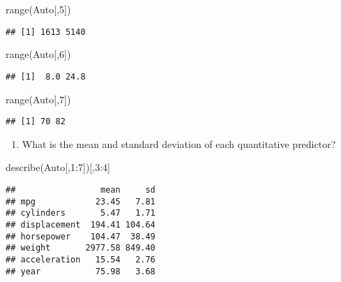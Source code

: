 \documentclass[
]{article}
\newenvironment{Shaded}{\begin{snugshade}}{\end{snugshade}}
\newcommand{\DecValTok}[1]{\textcolor[rgb]{0.00,0.00,0.81}{#1}}
\newcommand{\FunctionTok}[1]{\textcolor[rgb]{0.00,0.00,0.00}{#1}}
\newcommand{\NormalTok}[1]{#1}
\newcommand{\SpecialCharTok}[1]{\textcolor[rgb]{0.00,0.00,0.00}{#1}}
\providecommand{\tightlist}{%
  \setlength{\itemsep}{0pt}\setlength{\parskip}{0pt}}
\begin{document}
\begin{Shaded}
\begin{Highlighting}[]
\FunctionTok{range}\NormalTok{(Auto[,}\DecValTok{5}\NormalTok{])}
\end{Highlighting}
\end{Shaded}

\begin{verbatim}
## [1] 1613 5140
\end{verbatim}

\begin{Shaded}
\begin{Highlighting}[]
\FunctionTok{range}\NormalTok{(Auto[,}\DecValTok{6}\NormalTok{])}
\end{Highlighting}
\end{Shaded}

\begin{verbatim}
## [1]  8.0 24.8
\end{verbatim}

\begin{Shaded}
\begin{Highlighting}[]
\FunctionTok{range}\NormalTok{(Auto[,}\DecValTok{7}\NormalTok{])}
\end{Highlighting}
\end{Shaded}

\begin{verbatim}
## [1] 70 82
\end{verbatim}

\begin{enumerate}
\def\labelenumi{(\alph{enumi})}
\setcounter{enumi}{2}
\tightlist
\item
  What is the mean and standard deviation of each quantitative
  predictor?
\end{enumerate}

\begin{Shaded}
\begin{Highlighting}[]
\FunctionTok{describe}\NormalTok{(Auto[,}\DecValTok{1}\SpecialCharTok{:}\DecValTok{7}\NormalTok{])[,}\DecValTok{3}\SpecialCharTok{:}\DecValTok{4}\NormalTok{]}
\end{Highlighting}
\end{Shaded}

\begin{verbatim}
##                 mean     sd
## mpg            23.45   7.81
## cylinders       5.47   1.71
## displacement  194.41 104.64
## horsepower    104.47  38.49
## weight       2977.58 849.40
## acceleration   15.54   2.76
## year           75.98   3.68
\end{verbatim}
\end{document}
